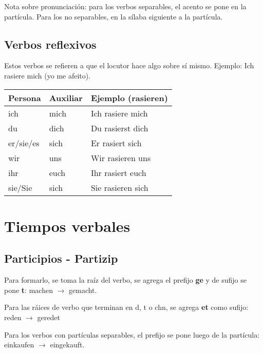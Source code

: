 Nota sobre pronunciación: para los verbos separables, el acento se pone en la partícula. Para los no separables, en la sílaba siguiente a la partícula.

\subsection{Verbos reflexivos}
Estos verbos se refieren a que el locutor hace algo sobre sí mismo. Ejemplo: Ich rasiere mich (yo me afeito).

\begin{tabular}{| l | l l |}
\hline
\textbf{Persona} & \textbf{Auxiliar} & \textbf{Ejemplo (rasieren)}\\
\hline
ich & mich & Ich rasiere mich\\
du & dich & Du rasierst dich\\
er/sie/es & sich & Er rasiert sich\\
wir & uns & Wir rasieren uns\\
ihr & euch & Ihr rasiert euch \\
sie/Sie & sich & Sie rasieren sich\\
\hline
\end{tabular}

\section{Tiempos verbales}
\subsection{Participios - Partizip}
Para formarlo, se toma la raíz del verbo, se agrega el prefijo \textbf{ge} y de sufijo se pone \textbf{t}: machen $\rightarrow$ gemacht.

Para las ráices de verbo que terminan en d, t o chn, se agrega \textbf{et} como sufijo: reden $\rightarrow$ geredet

Para los verbos con partículas separables, el prefijo se pone luego de la partícula: einkaufen $\rightarrow$ eingekauft.

